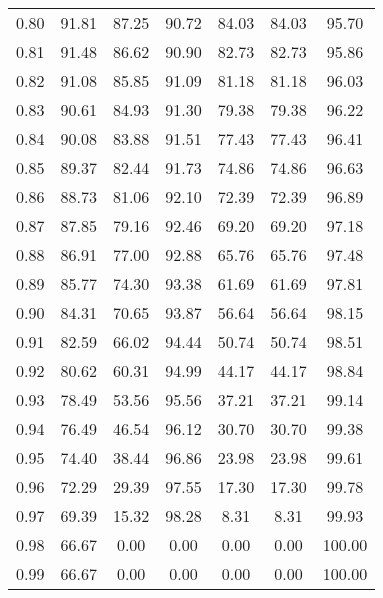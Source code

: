 \begin{tabular}{|c|c|c|c|c|c|c|}
      0.80 &     91.81 &     87.25 &      90.72 &   84.03 &      84.03 &         95.70 \\
      0.81 &     91.48 &     86.62 &      90.90 &   82.73 &      82.73 &         95.86 \\
      0.82 &     91.08 &     85.85 &      91.09 &   81.18 &      81.18 &         96.03 \\
      0.83 &     90.61 &     84.93 &      91.30 &   79.38 &      79.38 &         96.22 \\
      0.84 &     90.08 &     83.88 &      91.51 &   77.43 &      77.43 &         96.41 \\
      0.85 &     89.37 &     82.44 &      91.73 &   74.86 &      74.86 &         96.63 \\
      0.86 &     88.73 &     81.06 &      92.10 &   72.39 &      72.39 &         96.89 \\
      0.87 &     87.85 &     79.16 &      92.46 &   69.20 &      69.20 &         97.18 \\
      0.88 &     86.91 &     77.00 &      92.88 &   65.76 &      65.76 &         97.48 \\
      0.89 &     85.77 &     74.30 &      93.38 &   61.69 &      61.69 &         97.81 \\
      0.90 &     84.31 &     70.65 &      93.87 &   56.64 &      56.64 &         98.15 \\
      0.91 &     82.59 &     66.02 &      94.44 &   50.74 &      50.74 &         98.51 \\
      0.92 &     80.62 &     60.31 &      94.99 &   44.17 &      44.17 &         98.84 \\
      0.93 &     78.49 &     53.56 &      95.56 &   37.21 &      37.21 &         99.14 \\
      0.94 &     76.49 &     46.54 &      96.12 &   30.70 &      30.70 &         99.38 \\
      0.95 &     74.40 &     38.44 &      96.86 &   23.98 &      23.98 &         99.61 \\
      0.96 &     72.29 &     29.39 &      97.55 &   17.30 &      17.30 &         99.78 \\
      0.97 &     69.39 &     15.32 &      98.28 &    8.31 &       8.31 &         99.93 \\
      0.98 &     66.67 &      0.00 &       0.00 &    0.00 &       0.00 &        100.00 \\
      0.99 &     66.67 &      0.00 &       0.00 &    0.00 &       0.00 &        100.00 \\
\bottomrule
\end{tabular}
